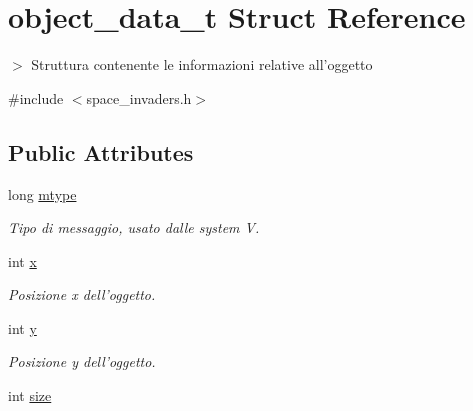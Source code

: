 \hypertarget{structobject__data__t}{
\section{object\_\-data\_\-t Struct Reference}
\label{structobject__data__t}
}


$>$ Struttura contenente le informazioni relative all'oggetto  




{\ttfamily \#include $<$space\_\-invaders.h$>$}

\subsection*{Public Attributes}
\begin{DoxyCompactItemize}
\item 
\hypertarget{structobject__data__t_a57ac9bfebd2b814a9aa55fdd4091e517}{
long \hyperlink{structobject__data__t_a57ac9bfebd2b814a9aa55fdd4091e517}{mtype}}
\label{structobject__data__t_a57ac9bfebd2b814a9aa55fdd4091e517}

\begin{DoxyCompactList}\small\item\em Tipo di messaggio, usato dalle system V. \item\end{DoxyCompactList}\item 
\hypertarget{structobject__data__t_ab0218a91c693c4f5b505535185a0f646}{
int \hyperlink{structobject__data__t_ab0218a91c693c4f5b505535185a0f646}{x}}
\label{structobject__data__t_ab0218a91c693c4f5b505535185a0f646}

\begin{DoxyCompactList}\small\item\em Posizione x dell'oggetto. \item\end{DoxyCompactList}\item 
\hypertarget{structobject__data__t_ae45af4ef1b3711f227bc6bd641a0f2ac}{
int \hyperlink{structobject__data__t_ae45af4ef1b3711f227bc6bd641a0f2ac}{y}}
\label{structobject__data__t_ae45af4ef1b3711f227bc6bd641a0f2ac}

\begin{DoxyCompactList}\small\item\em Posizione y dell'oggetto. \item\end{DoxyCompactList}\item 
\hypertarget{structobject__data__t_adf2ea19b439460538eeda356948d5883}{
int \hyperlink{structobject__data__t_adf2ea19b439460538eeda356948d5883}{size}}
\label{structobject__data__t_adf2ea19b439460538eeda356948d5883}


\end{DoxyCompactItemize}

